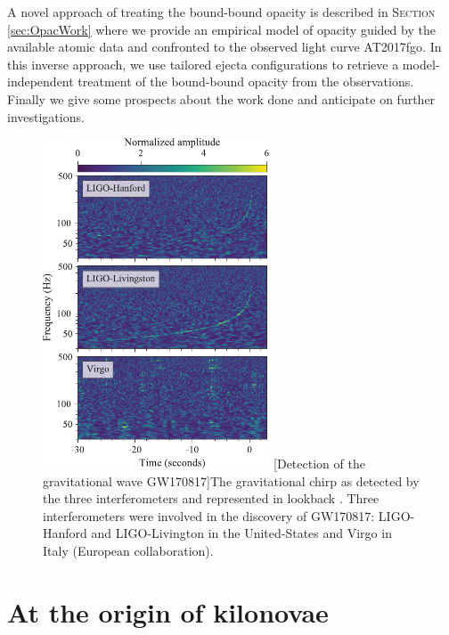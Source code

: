 \documentclass[a4paper, twoside, 11pt]{article}
\numberwithin{equation}{section}
\newcommand{\thesisauthor}{\textsc{Issa} Lina}
\begin{document}
A novel approach of treating the bound-bound opacity is described in S\textsc{ection} \ref{sec:OpacWork} where we provide an empirical model of opacity guided by the available atomic data and confronted to the observed light curve  AT2017fgo. In this inverse approach, we use tailored ejecta configurations to retrieve a model-independent treatment of the bound-bound opacity from the observations. \\

Finally we give some prospects about the work done and anticipate on further investigations. 

\begin{figure}
\includegraphics[width=0.6\textwidth]{pictures/LIGO_VIRGO.pdf}
	[Detection of the gravitational wave GW170817]{The gravitational chirp as detected by the three interferometers and represented in lookback \cite{chirp}. 
	Three interferometers were involved in the discovery of GW170817: LIGO-Hanford and LIGO-Livington in the United-States and Virgo in Italy (European collaboration). }
	\label{fig:chirp}
\end{figure} 

\newpage
\pagestyle{fancy}
\fancyhead{}
\fancyhead[LE,RO]{\textsl{\leftmark}}
\fancyhead[RE,LO]{\thesisauthor}
\tableofcontents
\pagebreak
\listoffigures
\listoftables
\newpage
\section{At the origin of kilonovae}
\vspace{10pt}
\label{sec: kn_origin}
\end{document}
